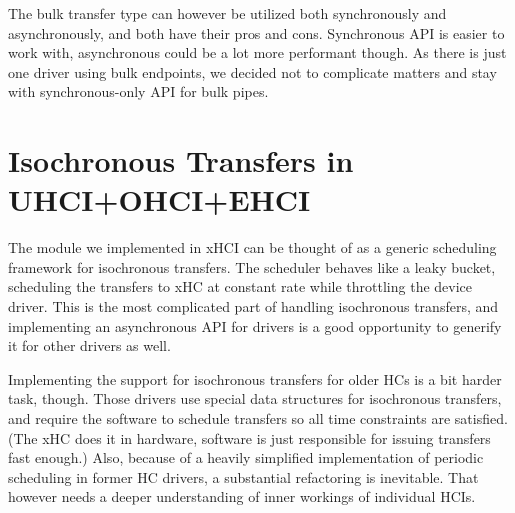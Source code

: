 The bulk transfer type can however be utilized both synchronously and
asynchronously, and both have their pros and cons. Synchronous API is easier to
work with, asynchronous could be a lot more performant though. As there is just
one driver using bulk endpoints, we decided not to complicate matters and stay
with synchronous-only API for bulk pipes.

\section{Isochronous Transfers in UHCI+OHCI+EHCI}

The module we implemented in xHCI can be thought of as a generic scheduling
framework for isochronous transfers. The scheduler behaves like a leaky bucket,
scheduling the transfers to xHC at constant rate while throttling the device
driver. This is the most complicated part of handling isochronous transfers,
and implementing an asynchronous API for drivers is a good opportunity to
generify it for other drivers as well.

Implementing the support for isochronous transfers for older HCs is a bit
harder task, though. Those drivers use special data structures for isochronous
transfers, and require the software to schedule transfers so all time
constraints are satisfied. (The xHC does it in hardware, software is just
responsible for issuing transfers fast enough.) Also, because of a heavily
simplified implementation of periodic scheduling in former HC drivers,
a substantial refactoring is inevitable. That however needs a deeper
understanding of inner workings of individual HCIs.
